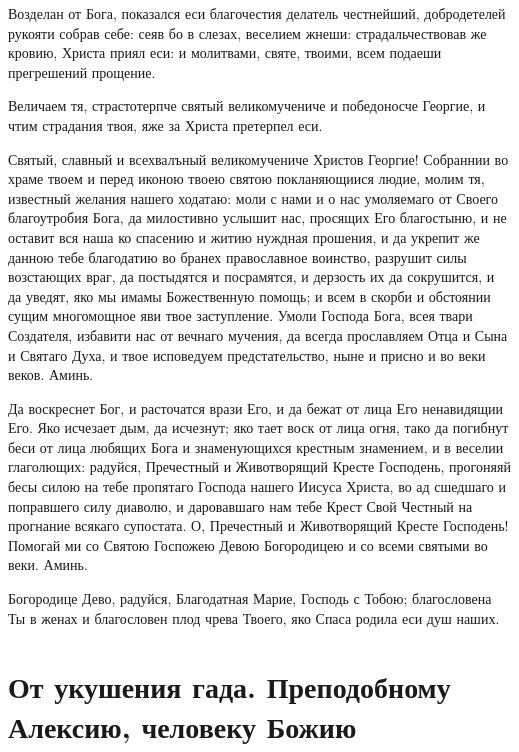 Возделан от Бога, показался еси благочестия делатель честнейший, добродетелей рукояти собрав себе: сеяв бо в слезах, веселием жнеши: страдальчествовав же кровию, Христа приял еси: и молитвами, святе, твоими, всем подаеши прегрешений прощение.




Величаем тя, страстотерпче святый великомучениче и победоносче Георгие, и чтим страдания твоя, яже за Христа претерпел еси.




Святый, славный и всехвалъный великомучениче Христов Георгие! Собраннии во храме твоем и перед иконою твоею святою покланяющиися людие, молим тя, известный желания нашего ходатаю: моли с нами и о нас умоляемаго от Своего благоутробия Бога, да милостивно услышит нас, просящих Его благостыню, и не оставит вся наша ко спасению и житию нуждная прошения, и да укрепит же данною тебе благодатию во бранех православное воинство, разрушит силы возстающих враг, да постыдятся и посрамятся, и дерзость их да сокрушится, и да уведят, яко мы имамы Божественную помощь; и всем в скорби и обстоянии сущим многомощное яви твое заступление. Умоли Господа Бога, всея твари Создателя, избавити нас от вечнаго мучения, да всегда прославляем Отца и Сына и Святаго Духа, и твое исповедуем предстательство, ныне и присно и во веки веков. Аминь.


Да воскреснет Бог, и расточатся врази Его, и да бежат от лица Его ненавидящии Его. Яко исчезает дым, да исчезнут; яко тает воск от лица огня, тако да погибнут беси от лица любящих Бога и знаменующихся крестным знамением, и в веселии глаголющих: радуйся, Пречестный и Животворящий Кресте Господень, прогоняяй бесы силою на тебе пропятаго Господа нашего Иисуса Христа, во ад сшедшаго и поправшего силу диаволю, и даровавшаго нам тебе Крест Свой Честный на прогнание всякаго супостата. О, Пречестный и Животворящий Кресте Господень! Помогай ми со Святою Госпожею Девою Богородицею и со всеми святыми во веки. Аминь.


Богородице Дево, радуйся, Благодатная Марие, Господь с Тобою; благословена Ты в женах и благословен плод чрева Твоего, яко Спаса родила еси душ наших.
\mychapterending


 

\section{От укушения гада.  Преподобному Алексию, человеку Божию}
 


